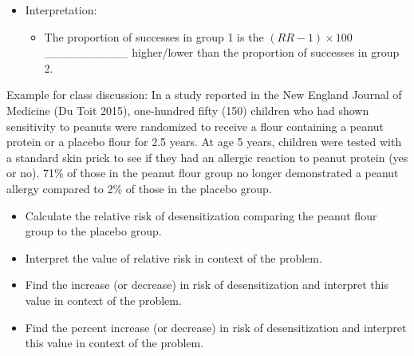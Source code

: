 \documentclass[
]{report}
\providecommand{\tightlist}{%
  \setlength{\itemsep}{0pt}\setlength{\parskip}{0pt}}
\begin{document}
\begin{itemize}
\item
  Interpretation:

  \begin{itemize}
  \tightlist
  \item
    The proportion of successes in group 1 is the \((RR-1)\times 100\) \_\_\_\_\_\_\_\_\_\_ higher/lower than the proportion of successes in group 2.
  \end{itemize}
\end{itemize}


Example for class discussion: In a study reported in the New England Journal of Medicine (Du Toit 2015), one-hundred fifty (150) children who had shown sensitivity to peanuts were randomized to receive a flour containing a peanut protein or a placebo flour for 2.5 years. At age 5 years, children were tested with a standard skin prick to see if they had an allergic reaction to peanut protein (yes or no). 71\% of those in the peanut flour group no longer demonstrated a peanut allergy compared to 2\% of those in the placebo group.

\begin{itemize}
\tightlist
\item
  Calculate the relative risk of desensitization comparing the peanut flour group to the placebo group.
\end{itemize}

\vspace{0.8in}

\begin{itemize}
\tightlist
\item
  Interpret the value of relative risk in context of the problem.
\end{itemize}

\vspace{0.6in}

\begin{itemize}
\tightlist
\item
  Find the increase (or decrease) in risk of desensitization and interpret this value in context of the problem.
\end{itemize}

\vspace{1in}

\begin{itemize}
\tightlist
\item
  Find the percent increase (or decrease) in risk of desensitization and interpret this value in context of the problem.
\end{itemize}
\end{document}
